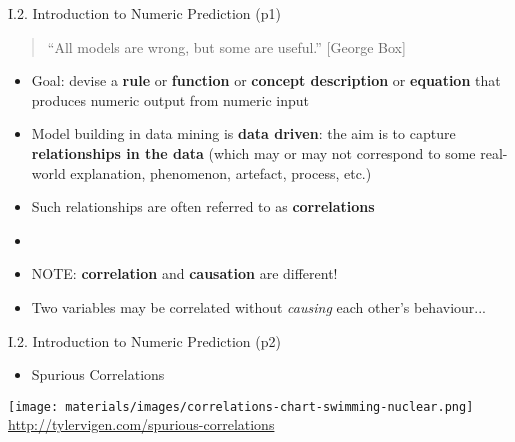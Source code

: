 \documentclass[handout]{beamer}
\newcommand{\strong}[1]{\textbf{\color{teal} #1}}
\newcommand{\stronger}[1]{\textbf{\color{purple} #1}}
\begin{document}
\begin{frame}{I.2. Introduction to Numeric Prediction (p1)}
\begin{quote}
``All models are wrong, but some are useful.'' {\small [George Box]}
\end{quote}
\begin{itemize}
\item Goal: devise a \stronger{rule} or \stronger{function} or \stronger{concept description} or \stronger{equation} that produces numeric output from numeric input
\item Model building in data mining is \stronger{data driven}: the aim is to capture \strong{relationships in the data} (which may or may not correspond to some real-world explanation, phenomenon, artefact, process, etc.)
\item Such relationships are often referred to as \strong{correlations}
\item[]
\item NOTE: \strong{correlation} and \strong{causation} are different!
\item Two variables may be correlated without \emph{causing} each other's behaviour...
\end{itemize}
\end{frame}
\begin{frame}{I.2. Introduction to Numeric Prediction (p2)}
\begin{itemize}
\item[] Spurious Correlations
\end{itemize}
\begin{center}
\texttt{[image: materials/images/correlations-chart-swimming-nuclear.png]}\\
\url{http://tylervigen.com/spurious-correlations}
\end{center}
\end{frame}
\end{document}
